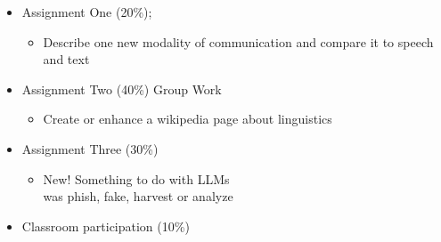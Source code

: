 \documentclass[a4paper,landscape,headrule,footrule,xetex]{foils}
\begin{document}
\begin{itemize}
\item Assignment One (20\%); 
  \begin{itemize}
  \item Describe one new modality of communication and compare it to
    speech and text 
  \end{itemize}
\item Assignment Two (40\%) Group Work
  \begin{itemize}
  \item Create or enhance a wikipedia page about linguistics
  \end{itemize}
\item Assignment Three (30\%)
  \begin{itemize}
  \item New!  Something to do with LLMs
\\ was phish, fake, harvest or analyze
  \end{itemize}
\item Classroom participation  (10\%)
\end{itemize}




%
\end{document}
